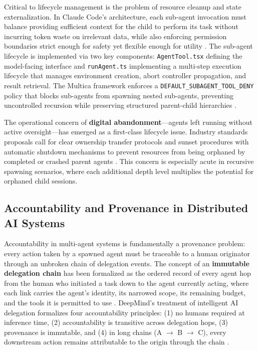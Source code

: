 Critical to lifecycle management is the problem of resource cleanup and state externalization. In Claude Code's architecture, each sub-agent invocation must balance providing sufficient context for the child to perform its task without incurring token waste on irrelevant data, while also enforcing permission boundaries strict enough for safety yet flexible enough for utility \cite{claudecode2025subagents}. The sub-agent lifecycle is implemented via two key components: \texttt{AgentTool.tsx} defining the model-facing interface and \texttt{runAgent.ts} implementing a multi-step execution lifecycle that manages environment creation, abort controller propagation, and result retrieval. The Multica framework enforces a \texttt{DEFAULT\_SUBAGENT\_TOOL\_DENY} policy that blocks sub-agents from spawning nested sub-agents, preventing uncontrolled recursion while preserving structured parent-child hierarchies \cite{multica2025sessionsspawn}.

The operational concern of \textbf{digital abandonment}---agents left running without active oversight---has emerged as a first-class lifecycle issue. Industry standards proposals call for clear ownership transfer protocols and sunset procedures with automatic shutdown mechanisms to prevent resources from being orphaned by completed or crashed parent agents \cite{astrasyncai2025abandonment}. This concern is especially acute in recursive spawning scenarios, where each additional depth level multiplies the potential for orphaned child sessions.

\subsection{Accountability and Provenance in Distributed AI Systems}

Accountability in multi-agent systems is fundamentally a provenance problem: every action taken by a spawned agent must be traceable to a human originator through an unbroken chain of delegation events. The concept of an \textbf{immutable delegation chain} has been formalized as the ordered record of every agent hop from the human who initiated a task down to the agent currently acting, where each link carries the agent's identity, its narrowed scope, its remaining budget, and the tools it is permitted to use \cite{agenticcontrolplane2025delegation}. DeepMind's treatment of intelligent AI delegation formalizes four accountability principles: (1) no humans required at inference time, (2) accountability is transitive across delegation hops, (3) provenance is immutable, and (4) in long chains (A $\rightarrow$ B $\rightarrow$ C), every downstream action remains attributable to the origin through the chain \cite{deepmind2025delegation}.

